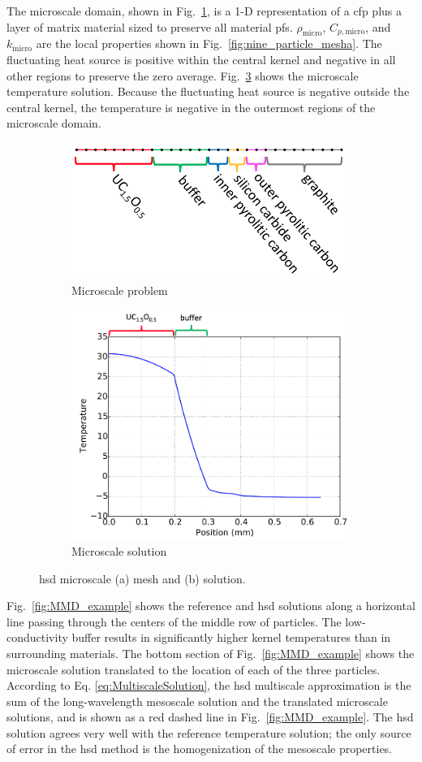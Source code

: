 The microscale domain, shown in Fig.\ \ref{fig:micro_a}, is a 1-D representation of a \gls{cfp} plus a layer of matrix material sized to preserve all material \glspl{pf}. \(\rho_\text{micro}\), \(C_{p,\text{micro}}\), and \(k_\text{micro}\) are the local properties shown in Fig.\ \ref{fig:nine_particle_mesha}. The fluctuating heat source is positive within the central kernel and negative in all other regions to preserve the zero average. Fig.\ \ref{fig:micro_b} shows the microscale temperature solution. Because the fluctuating heat source is negative outside the central kernel, the temperature is negative in the outermost regions of the microscale domain.

\begin{figure}[!h]
\centering
\begin{subfigure}[b]{0.49\linewidth}
\centering
\includegraphics[width=6.cm]{figs/microscale_domain_colored.png}
\vspace{2em}
\caption{Microscale problem}
\label{fig:micro_a}
\end{subfigure}
\begin{subfigure}[b]{0.49\linewidth}
\centering
\includegraphics[height=6.cm]{figs/microscale_solution.png}
\caption{Microscale solution}
\label{fig:micro_b}
\end{subfigure}
\caption{\gls{hsd} microscale (a) mesh and (b) solution.}
\end{figure}

Fig.\ \ref{fig:MMD_example} shows the reference and \gls{hsd} solutions along a horizontal line passing through the centers of the middle row of particles. The low-conductivity buffer results in significantly higher kernel temperatures than in surrounding materials. The bottom section of Fig.\ \ref{fig:MMD_example} shows the microscale solution translated to the location of each of the three particles. According to Eq. \eqref{eq:MultiscaleSolution}, the \gls{hsd} multiscale approximation is the sum of the long-wavelength mesoscale solution and the translated microscale solutions, and is shown as a red dashed line in Fig.\ \ref{fig:MMD_example}. The \gls{hsd} solution agrees very well with the reference temperature solution; the only source of error in the \gls{hsd} method is the homogenization of the mesoscale properties.

